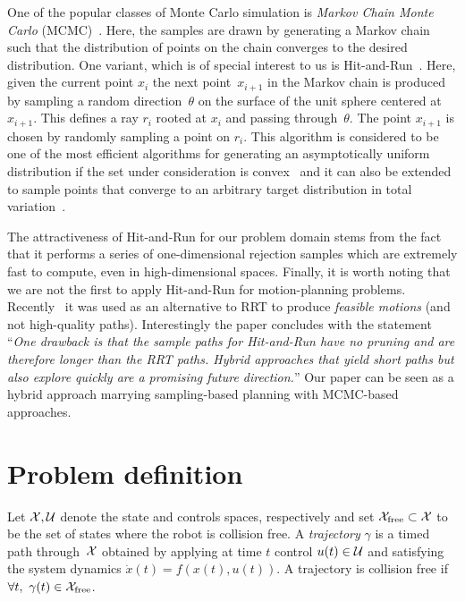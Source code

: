 \documentclass[letterpaper, 10 pt, conference]{ieeeconf}  %
\begin{document}
One of the popular classes of Monte Carlo simulation is 
\emph{Markov Chain Monte Carlo} (MCMC)~\cite{ADDJ03}.
Here, the samples are drawn by generating a Markov chain such that the distribution of points on the chain converges to the desired distribution.
One variant, which is of special interest to us is 
Hit-and-Run~\cite{KSZ11}.
Here, given the current point $x_i$ the next point~$x_{i+1}$ in the Markov chain is produced by sampling a random direction~$\theta$ on the surface of the unit sphere centered at $x_{i+1}$. This defines a ray $r_i$ rooted at $x_i$ and passing through~$\theta$. The point $x_{i+1}$ is chosen by randomly sampling a point on $r_i$.
This algorithm is considered to be one of the most efficient algorithms for generating an asymptotically uniform distribution if the set under consideration is convex~\cite{LV06}
and it can also be extended to sample points that converge to an arbitrary target distribution in total variation~\cite{RS94}.

The attractiveness of Hit-and-Run for our problem domain stems from the fact that it performs a series of one-dimensional rejection samples which are extremely fast to compute, even in high-dimensional spaces. 
Finally, it is worth noting that we are not the first to apply Hit-and-Run for motion-planning problems.
Recently~\cite{YPVA17} it was used as an alternative to RRT to produce \emph{feasible motions} (and not high-quality paths). 
Interestingly the paper concludes with the statement ``\emph{One drawback is that the sample paths for Hit-and-Run have no pruning and are therefore longer than the RRT paths. Hybrid approaches that yield short paths but also explore quickly are a promising future direction.}''
Our paper can be seen as a hybrid approach marrying sampling-based planning with MCMC-based approaches.

\section{Problem definition}
\label{sec:pdef}


Let $\mathcal{X}, \mathcal{U}$ denote the state and controls spaces, respectively and set $\mathcal{X}_{\rm free} \subset \mathcal{X}$ to be the set of states where the robot is collision free.
A \emph{trajectory} $\gamma$ is a timed path through~$\mathcal{X}$ obtained by applying at time $t$ control $u(t) \in \mathcal{U}$ and satisfying the system dynamics 
$\dot{x}(t) = f( x(t) , u(t) )$.
A trajectory is collision free if $\forall t,~\gamma(t) \in \mathcal{X}_{\rm free}$.
\end{document}
